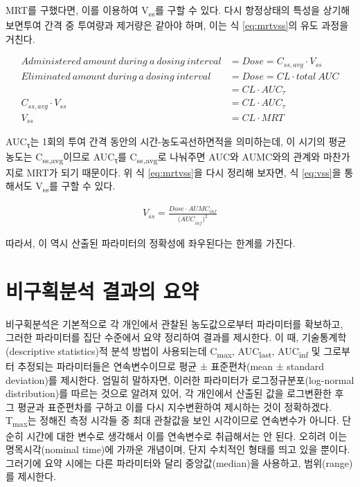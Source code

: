 \documentclass[
  11pt,
  krantz2, a4paper, twoside]{krantz}
\theoremstyle{definition}
\theoremstyle{definition}
\theoremstyle{definition}
\theoremstyle{definition}
\theoremstyle{remark}
\begin{document}
MRT를 구했다면, 이를 이용하여 V\textsubscript{ss}를 구할 수 있다. 다시 항정상태의 특성을 상기해 보면투여 간격 중 투여량과 제거량은 같아야 하며, 이는 식 \eqref{eq:mrtvss}의 유도 과정을 거친다.

\small

\begin{equation}
\begin{split}
  Administered\ amount\ during\ a\ dosing\ interval &= Dose = C_{ss,avg} \cdot V_{{ss}} \\
  Eliminated\ amount\ during\ a\ dosing\ interval &= Dose = CL \cdot total\ AUC \\
  \ \  &= CL \cdot AUC_{\tau} \\
  C_{ss,avg} \cdot V_{{ss}} &= CL \cdot AUC_{\tau} \\
  V_{{ss}} &= CL \cdot MRT
\end{split}
\label{eq:mrtvss}
\end{equation}

\normalsize

AUC\textsubscript{τ}는 1회의 투여 간격 동안의 시간-농도곡선하면적을 의미하는데, 이 시기의 평균 농도는 C\textsubscript{ss,avg}이므로 AUC\textsubscript{τ}를 C\textsubscript{ss,avg}로 나눠주면 AUC와 AUMC와의 관계와 마찬가지로 MRT가 되기 때문이다.
위 식 \eqref{eq:mrtvss}을 다시 정리해 보자면, 식 \eqref{eq:vss}을 통해서도 V\textsubscript{ss}를 구할 수 있다.

\begin{equation}
\begin{split}
  V_{ss} = \frac{Dose \cdot AUMC_{inf}}{{{(AUC}_{inf})}^2}
\end{split}
\label{eq:vss}
\end{equation}

따라서, 이 역시 산출된 파라미터의 정확성에 좌우된다는 한계를 가진다.

\hypertarget{uxbe44uxad6cuxd68duxbd84uxc11d-uxacb0uxacfcuxc758-uxc694uxc57d}{%
\section{비구획분석 결과의 요약}\label{uxbe44uxad6cuxd68duxbd84uxc11d-uxacb0uxacfcuxc758-uxc694uxc57d}}

비구획분석은 기본적으로 각 개인에서 관찰된 농도값으로부터 파라미터를 확보하고, 그러한 파라미터를 집단 수준에서 요약 정리하여 결과를 제시한다.
이 때, 기술통계학(descriptive statistics)적 분석 방법이 사용되는데 C\textsubscript{max}, AUC\textsubscript{last}, AUC\textsubscript{inf} 및 그로부터 추정되는 파라미터들은 연속변수이므로 평균 ± 표준편차(mean ± standard deviation)를 제시한다.
엄밀히 말하자면, 이러한 파라미터가 로그정규분포(log-normal distribution)를 따르는 것으로 알려져 있어, 각 개인에서 산출된 값을 로그변환한 후 그 평균과 표준편차를 구하고 이를 다시 지수변환하여 제시하는 것이 정확하겠다.
T\textsubscript{max}는 정해진 측정 시각들 중 최대 관찰값을 보인 시각이므로 연속변수가 아니다.
단순히 시간에 대한 변수로 생각해서 이를 연속변수로 취급해서는 안 된다.
오히려 이는 명목시각(nominal time)에 가까운 개념이며, 단지 수치적인 형태를 띄고 있을 뿐이다.
그러기에 요약 시에는 다른 파라미터와 달리 중앙값(median)을 사용하고, 범위(range)를 제시한다.
\end{document}
